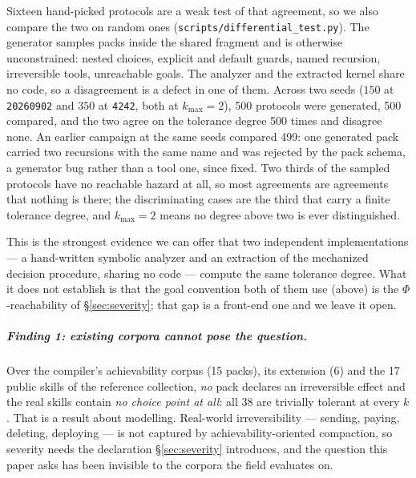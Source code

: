 \documentclass[a4paper,UKenglish,cleveref,autoref,thm-restate,anonymous]{lipics-v2021}
\begin{document}
Sixteen hand-picked protocols are a weak test of that agreement, so we also
compare the two on random ones (\texttt{scripts/differential\_test.py}). The
generator samples packs inside the shared fragment and is otherwise
unconstrained: nested choices, explicit and default guards, named recursion,
irreversible tools, unreachable goals. The analyzer and the extracted kernel
share no code, so a disagreement is a defect in one of them.
Across two seeds ($150$ at \texttt{20260902} and $350$ at \texttt{4242}, both
at $k_{\max}=2$), 500 protocols were generated, 500 compared, and the two agree
on the tolerance degree 500 times and disagree none. An earlier campaign at the
same seeds compared 499: one generated pack carried two recursions with the same
name and was rejected by the pack schema, a generator bug rather than a tool
one, since fixed. Two thirds of the sampled protocols have no reachable hazard
at all, so most agreements are agreements that nothing is there; the
discriminating cases are the third that carry a finite tolerance degree, and
$k_{\max}=2$ means no degree above two is ever distinguished.

This is the strongest evidence we can offer that two independent
implementations --- a hand-written symbolic analyzer and an extraction of the
mechanized decision procedure, sharing no code --- compute the same tolerance
degree. What it does not
establish is that the goal convention both of them use (above) is the
$\Phi$-reachability of \S\ref{sec:severity}; that gap is a front-end one and we
leave it open.

\subparagraph*{Finding 1: existing corpora cannot pose the question.}
Over the compiler's achievability corpus (15 packs), its extension (6) and the
17 public skills of the reference collection, \emph{no} pack declares an
irreversible effect and the real skills contain \emph{no choice point at all}:
all 38 are trivially tolerant at every $k$. That is a result about modelling.
Real-world irreversibility --- sending, paying, deleting, deploying --- is not
captured by achievability-oriented compaction, so severity needs the
declaration \S\ref{sec:severity} introduces, and the question this paper asks
has been invisible to the corpora the field evaluates on.
\end{document}
